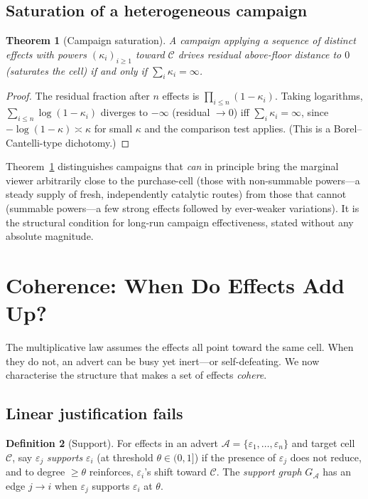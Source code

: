 \documentclass[twocolumn,11pt,a4paper]{article}
\theoremstyle{adv}
\newtheorem{theorem}{Theorem}[section]
\theoremstyle{definition}
\newtheorem{definition}[theorem]{Definition}
\theoremstyle{remark}
\newcommand{\Cell}{\mathcal{C}}        %
\newcommand{\Eff}{\varepsilon}        %
\newcommand{\pot}{\kappa}             %
\newcommand{\Adv}{\mathcal{A}}        %
\begin{document}
\subsection{Saturation of a heterogeneous campaign}

\begin{theorem}[Campaign saturation]
\label{thm:saturation}
A campaign applying a sequence of distinct effects with powers
$(\pot_i)_{i\ge1}$ toward $\Cell$ drives residual above-floor distance to
$0$ (saturates the cell) if and only if $\sum_i\pot_i=\infty$.
\end{theorem}

\begin{proof}
The residual fraction after $n$ effects is $\prod_{i\le n}(1-\pot_i)$.
Taking logarithms, $\sum_{i\le n}\log(1-\pot_i)$ diverges to $-\infty$
(residual $\to0$) iff $\sum_i\pot_i=\infty$, since
$-\log(1-\pot)\asymp\pot$ for small $\pot$ and the comparison test
applies. (This is a Borel--Cantelli-type dichotomy.)
\end{proof}

Theorem~\ref{thm:saturation} distinguishes campaigns that \emph{can} in
principle bring the marginal viewer arbitrarily close to the purchase-cell
(those with non-summable powers---a steady supply of fresh, independently
catalytic routes) from those that cannot (summable powers---a few strong
effects followed by ever-weaker variations). It is the structural
condition for long-run campaign effectiveness, stated without any absolute
magnitude.

\section{Coherence: When Do Effects Add Up?}
\label{sec:coherence}

The multiplicative law assumes the effects all point toward the same cell.
When they do not, an advert can be busy yet inert---or self-defeating. We
now characterise the structure that makes a set of effects \emph{cohere}.

\subsection{Linear justification fails}

\begin{definition}[Support]
\label{def:support}
For effects in an advert $\Adv=\{\Eff_1,\dots,\Eff_n\}$ and target cell
$\Cell$, say $\Eff_j$ \emph{supports} $\Eff_i$ (at threshold
$\theta\in(0,1]$) if the presence of $\Eff_j$ does not reduce, and to
degree $\ge\theta$ reinforces, $\Eff_i$'s shift toward $\Cell$. The
\emph{support graph} $G_\Adv$ has an edge $j\to i$ when $\Eff_j$ supports
$\Eff_i$ at $\theta$.
\end{definition}
\end{document}
